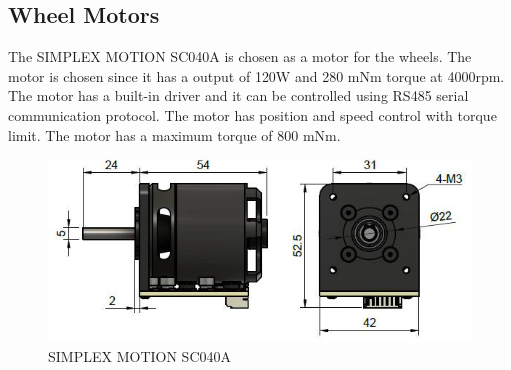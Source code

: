\subsection{Wheel Motors}
The SIMPLEX MOTION SC040A is chosen as a motor for the wheels. The motor is chosen since it has a output of 120W and 280 mNm torque at 4000rpm. The motor has a built-in driver and it can be controlled using RS485 serial communication protocol. The motor has  position and speed control with torque limit. The motor has a maximum torque of 800 mNm.
\begin{figure}[h]
	\centering
	\includegraphics[width=0.5\linewidth]{SIMPLEX_MOTION_SC040A}
	\caption[SIMPLEX MOTION SC040A]{SIMPLEX MOTION SC040A}
	\label{fig:SIMPLEX_MOTION_SC040A}
\end{figure}


